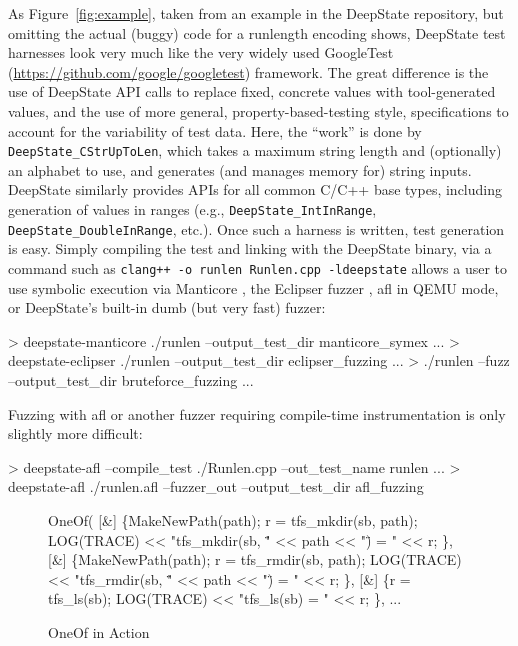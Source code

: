 \documentclass[sigconf]{acmart}
\begin{document}
  As Figure~\ref{fig:example}, taken from an example in the DeepState repository, but omitting the actual (buggy) code for a runlength encoding shows, DeepState test harnesses look very much like the very widely used GoogleTest (\url{https://github.com/google/googletest}) framework.  The great difference is the use of DeepState API calls to replace fixed, concrete values with tool-generated values, and the use of more general, property-based-testing style, specifications to account for the variability of test data.  Here, the ``work'' is done by {\tt DeepState\_CStrUpToLen}, which takes a maximum string length and (optionally) an alphabet to use, and generates (and manages memory for) string inputs.  DeepState similarly provides APIs for all common C/C++ base types, including generation of values in ranges (e.g., {\tt DeepState\_IntInRange}, {\tt DeepState\_DoubleInRange}, etc.).
Once such a harness is written, test generation is easy.  Simply compiling the test and linking with the DeepState binary, via a command such as {\tt clang++ -o runlen Runlen.cpp -ldeepstate} allows a user to use symbolic execution via Manticore \cite{mossberg2019manticore}, the Eclipser fuzzer \cite{choi:icse:2019}, afl in QEMU mode, or DeepState's built-in dumb (but very fast) fuzzer:

  {\scriptsize
\begin{code}
> deepstate-manticore ./runlen --output\_test\_dir manticore\_symex
...
> deepstate-eclipser ./runlen --output\_test\_dir eclipser\_fuzzing
...
> ./runlen --fuzz --output\_test\_dir bruteforce\_fuzzing
...
\end{code}
}

Fuzzing with afl or another fuzzer requiring compile-time instrumentation is only slightly more difficult:

{\scriptsize
\begin{code}
> deepstate-afl --compile\_test ./Runlen.cpp --out\_test\_name runlen
...
> deepstate-afl ./runlen.afl --fuzzer\_out --output\_test\_dir afl\_fuzzing
\end{code}
}

\begin{figure}
{\scriptsize
\begin{code}
    OneOf(
	  [\&] \{MakeNewPath(path);
            r = tfs\_mkdir(sb, path);
            LOG(TRACE) << "tfs\_mkdir(sb, \"" << path << "\") = " << r;
	  \},
	  [\&] \{MakeNewPath(path);
            r = tfs\_rmdir(sb, path);
            LOG(TRACE) << "tfs\_rmdir(sb, \"" << path << "\") = " << r;
	  \},
	  [\&] \{r = tfs\_ls(sb);
            LOG(TRACE) << "tfs\_ls(sb) = " << r;
	  \},
   ...
\end{code}
}
  \caption{OneOf in Action}
  \label{fig:oneof}
  \end{figure}
\end{document}
